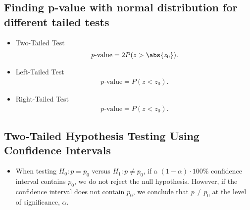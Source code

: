 \documentclass{report}
\begin{document}
    \subsection*{Finding p-value with normal distribution for different tailed tests}
    \bigbreak \noindent 
    \begin{itemize}
      \item Two-Tailed Test
        \begin{align*}
          p\text{-value} = 2P(z > \abs{z_{0}})
        .\end{align*}
      \item Left-Tailed Test
        \begin{align*}
          p\text{-value} = P(z<z_{0})
        .\end{align*}
            \item Right-Tailed Test
        \begin{align*}
          p\text{-value} = P(z<z_{0})
        .\end{align*}
    \end{itemize}

    \bigbreak \noindent \bigbreak \noindent 
    \subsection*{Two-Tailed Hypothesis Testing Using Confidence Intervals}
    \bigbreak \noindent 
    \begin{itemize}
        \item  When testing \(H_0: p = p_0\) versus \(H_1: p \neq p_0\), if a \((1 - \alpha) \cdot 100\%\) confidence interval contains \(p_0\), we do not reject the null hypothesis. However, if the confidence interval does not contain \(p_0\), we conclude that \(p \neq p_0\) at the level of significance, \(\alpha\).
    \end{itemize}

    \bigbreak \noindent \bigbreak \noindent 
\end{document}
